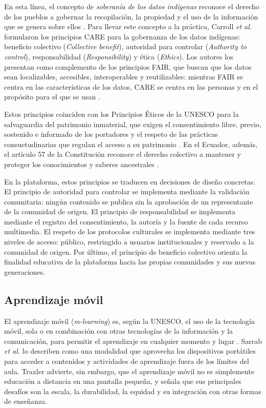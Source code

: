 En esta línea, el concepto de \textit{soberanía de los datos indígenas} reconoce el derecho de los pueblos a gobernar la recopilación, la propiedad y el uso de la información que se genera sobre ellos \cite{kukutai2016indigenous,hudson2023indigenous}. Para llevar este concepto a la práctica, Carroll \textit{et al.} \cite{carroll2020care} formularon los principios CARE para la gobernanza de los datos indígenas: beneficio colectivo (\textit{Collective benefit}), autoridad para controlar (\textit{Authority to control}), responsabilidad (\textit{Responsibility}) y ética (\textit{Ethics}). Los autores los presentan como complemento de los principios FAIR, que buscan que los datos sean localizables, accesibles, interoperables y reutilizables: mientras FAIR se centra en las características de los datos, CARE se centra en las personas y en el propósito para el que se usan \cite{carroll2020care}.

Estos principios coinciden con los Principios Éticos de la UNESCO para la salvaguardia del patrimonio inmaterial, que exigen el consentimiento libre, previo, sostenido e informado de los portadores y el respeto de las prácticas consuetudinarias que regulan el acceso a su patrimonio \cite{unesco2015ethical}. En el Ecuador, además, el artículo 57 de la Constitución reconoce el derecho colectivo a mantener y proteger los conocimientos y saberes ancestrales \cite{ecuador2008constitucion}.

En la plataforma, estos principios se traducen en decisiones de diseño concretas. El principio de autoridad para controlar se implementa mediante la validación comunitaria: ningún contenido se publica sin la aprobación de un representante de la comunidad de origen. El principio de responsabilidad se implementa mediante el registro del consentimiento, la autoría y la fuente de cada recurso multimedia. El respeto de los protocolos culturales se implementa mediante tres niveles de acceso: público, restringido a usuarios institucionales y reservado a la comunidad de origen. Por último, el principio de beneficio colectivo orienta la finalidad educativa de la plataforma hacia las propias comunidades y sus nuevas generaciones.

\subsection{Aprendizaje móvil}
El aprendizaje móvil (\textit{m-learning}) es, según la UNESCO, el uso de la tecnología móvil, sola o en combinación con otras tecnologías de la información y la comunicación, para permitir el aprendizaje en cualquier momento y lugar \cite{unesco2013mobile}. Sarrab \textit{et al.} \cite{sarrab2012mobile} lo describen como una modalidad que aprovecha los dispositivos portátiles para acceder a contenidos y actividades de aprendizaje fuera de los límites del aula. Traxler \cite{traxler2009mobile} advierte, sin embargo, que el aprendizaje móvil no es simplemente educación a distancia en una pantalla pequeña, y señala que sus principales desafíos son la escala, la durabilidad, la equidad y su integración con otras formas de enseñanza.


